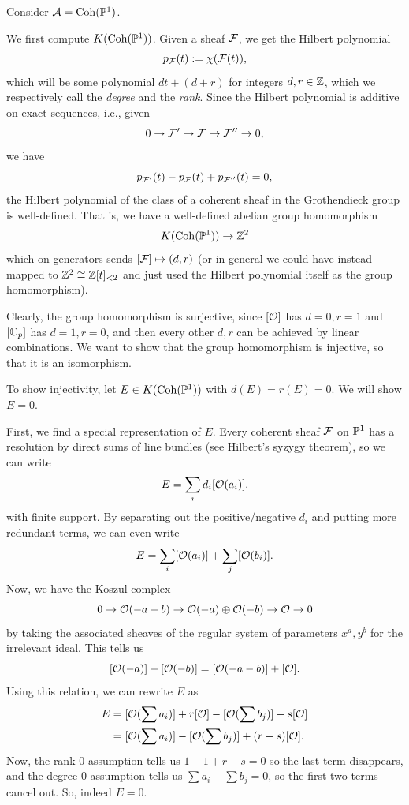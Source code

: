\documentclass[12pt]{article}
\begin{document}
\begin{eg}
    Consider $\cA = \Coh(\P^1)$.
    
    We first compute $K(\Coh(\P^1))$. Given a sheaf $\cF$, we get the Hilbert polynomial
    \[p_\cF(t) \defeq \chi(\cF(t)),\]
    which will be some polynomial $dt + (d+r)$ for integers $d,r\in \Z$, which we respectively call the \textit{degree} and the \textit{rank}. Since the Hilbert polynomial is additive on exact sequences, i.e., given
    \[0 \to \cF' \to \cF \to \cF'' \to 0,\]
    we have
    \[p_{\cF'}(t) - p_{\cF}(t) + p_{\cF''}(t) = 0,\]
    the Hilbert polynomial of the class of a coherent sheaf in the Grothendieck group is well-defined. That is, we have a well-defined abelian group homomorphism
    \[K(\Coh(\P^1)) \to \Z^2\]
    which on generators sends $[\cF] \mapsto (d,r)$ (or in general we could have instead mapped to $\Z^2 \cong \Z[t]_{<2}$ and just used the Hilbert polynomial itself as the group homomorphism).

    Clearly, the group homomorphism is surjective, since $[\cO]$ has $d=0,r=1$ and $[\C_p]$ has $d=1,r=0$, and then every other $d,r$ can be achieved by linear combinations. We want to show that the group homomorphism is injective, so that it is an isomorphism.
    
    To show injectivity, let $E \in K(\Coh(\P^1))$ with $d(E)=r(E)=0$. We will show $E=0$.
    
    First, we find a special representation of $E$. Every coherent sheaf $\cF$ on $\P^1$ has a resolution by direct sums of line bundles (see Hilbert's syzygy theorem), so we can write
    \[E=\sum_i d_i [\cO(a_i)].\]
    with finite support. By separating out the positive/negative $d_i$ and putting more redundant terms, we can even write
    \[E = \sum_i [\cO(a_i)] + \sum_j [\cO(b_i)].\]
    Now, we have the Koszul complex
    \[0 \to \cO(-a-b) \to \cO(-a)\oplus \cO(-b) \to \cO \to 0\]
    by taking the associated sheaves of the regular system of parameters $x^a,y^b$ for the irrelevant ideal. This tells us
    \[[\cO(-a)] + [\cO(-b)] = [\cO(-a-b)] + [\cO].\]
    Using this relation, we can rewrite $E$ as
    \begin{align*}
        E &= [\cO(\sum a_i)] + r[\cO] - [\cO(\sum b_j)] - s[\cO]\\
        &= [\cO(\sum a_i)] - [\cO(\sum b_j)] + (r-s)[\cO].
    \end{align*}
    Now, the rank $0$ assumption tells us $1-1+r-s=0$ so the last term disappears, and the degree $0$ assumption tells us $\sum a_i - \sum b_j = 0$, so the first two terms cancel out. So, indeed $E=0$.
\end{eg}
\end{document}
